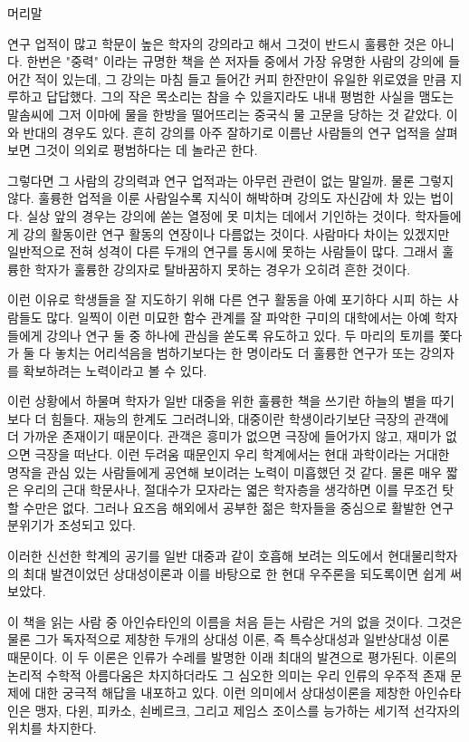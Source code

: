 

\titlepage

\def\lhead{아인슈타인과의 두뇌게임}
\def\rhead{머리말}
\centerline{\sectionfont 머리말}\vskip 1in

\noindent
연구 업적이 많고 학문이 높은 학자의 강의라고 해서 그것이 반드시 훌륭한 것은 아니다.
한번은 "중력" 이라는 규명한 책을 쓴 저자들 중에서 가장 유명한 사람의 강의에 들어간 적이
있는데, 그 강의는 마침 들고 들어간 커피 한잔만이 유일한 위로였을 만큼 지루하고 답답했다.
그의 작은 목소리는 참을 수 있을지라도 내내 평범한 사실을 맴도는 말솜씨에 그저 이마에 물을
한방을 떨어뜨리는 중국식 물 고문을 당하는 것 같았다. 이와 반대의 경우도 있다. 흔히 강의를
아주 잘하기로 이름난 사람들의 연구 업적을 살펴보면 그것이 의외로 평범하다는 데 놀라곤
한다.

그렇다면 그 사람의 강의력과 연구 업적과는 아무런 관련이 없는 말일까. 물론 그렇지 않다.
훌륭한 업적을 이룬 사람일수록 지식이 해박하며 강의도 자신감에 차 있는 법이다. 실상 앞의
경우는 강의에 쏟는 열정에 못 미치는 데에서 기인하는 것이다. 학자들에게 강의 활동이란 연구
활동의 연장이나 다름없는 것이다. 사람마다 차이는 있겠지만 일반적으로 전혀 성격이 다른
두개의 연구를 동시에 못하는 사람들이 많다. 그래서 훌륭한 학자가 훌륭한 강의자로 탈바꿈하지
못하는 경우가 오히려 흔한 것이다.

이런 이유로 학생들을 잘 지도하기 위해 다른 연구 활동을 아예 포기하다 시피 하는 사람들도
많다. 일찍이 이런 미묘한 함수 관계를 잘 파악한 구미의 대학에서는 아예 학자들에게 강의나
연구 둘 중 하나에 관심을 쏟도록 유도하고 있다. 두 마리의 토끼를 쫓다가 둘 다 놓치는
어리석음을 범하기보다는 한 명이라도 더 훌륭한 연구가 또는 강의자를 확보하려는 노력이라고
볼 수 있다.

이런 상황에서 하물며 학자가 일반 대중을 위한 훌륭한 책을 쓰기란 하늘의 별을
따기보다 더 힘들다. 재능의 한계도 그러려니와, 대중이란 학생이라기보단 극장의 관객에 더
가까운 존재이기 때문이다. 관객은 흥미가 없으면 극장에 들어가지 않고, 재미가 없으면 극장을
떠난다. 이런 두려움 때문인지 우리 학계에서는 현대 과학이라는 거대한 명작을 관심 있는
사람들에게 공연해 보이려는 노력이 미흡했던 것 같다. 물론 매우 짧은 우리의 근대 학문사나,
절대수가 모자라는 엷은 학자층을 생각하면 이를 무조건 탓할 수만은 없다. 그러나 요즈음
해외에서 공부한 젊은 학자들을 중심으로 활발한 연구 분위기가 조성되고 있다.

이러한 신선한 학계의 공기를 일반 대중과 같이 호흡해 보려는 의도에서 현대물리학자의
최대 발견이었던 상대성이론과 이를 바탕으로 한 현대 우주론을 되도록이면 쉽게 써 보았다.

이 책을 읽는 사람 중 아인슈타인의 이름을 처음 듣는 사람은 거의 없을 것이다. 그것은
물론 그가
독자적으로 제창한 두개의 상대성 이론, 즉 특수상대성과 일반상대성 이론 때문이다. 이 두
이론은 인류가 수레를 발명한 이래 최대의 발견으로 평가된다. 이론의 논리적 수학적 아름다움은
차지하더라도 그 심오한 의미는 우리 인류의 우주적 존재 문제에 대한 궁극적 해답을 내포하고
있다. 이런 의미에서 상대성이론을 제창한 아인슈타인은 맹자, 다윈, 피카소, 쇤베르크, 그리고
제임스 조이스를 능가하는 세기적 선각자의 위치를 차지한다.

